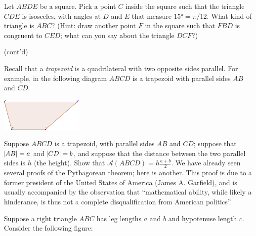\documentclass[answers]{exam}
\begin{document}
\begin{questions}
  \question Let $ ABDE $ be a square. Pick a point $ C $ inside the square such that the triangle $ CDE $ is isosceles,
            with angles at $ D $ and $ E $ that measure $ \ang{15} = \pi/12 $. What kind of triangle is $ ABC $? (Hint:
            draw another point $ F $ in the square such that $ FBD $ is congruent to $ CED $; what can you say about
            the triangle $ DCF $?)
  \vfill
  \begin{flushright} (cont'd)\end{flushright}
  \clearpage
  \question Recall that a \emph{trapezoid} is a quadrilateral with two opposite sides parallel. For example, in the following
            diagram $ ABCD $ is a trapezoid with parallel sides $ AB $ and $ CD $.

            \begin{center}
              \includegraphics[width=0.3\textwidth]{exercises-1-1}
            \end{center}

            Suppose $ ABCD $ is a trapezoid, with parallel sides $ AB $ and $ CD $; suppose that $ \abs{AB} = a $ and $ \abs{CD} = b $,
            and suppose that the distance between the two parallel sides is $ h $ (the height). Show that $ \mathcal{A}(ABCD) = h\frac{a + b}{2} $.
  \question We have already seen several proofs of the Pythagorean theorem; here is another. This proof is due to a former president
            of the United States of America (James A. Garfield), and is usually accompanied by the observation that ``mathematical ability, while likely a
            hinderance, is thus not a complete disqualification from American politics''.

            Suppose a right triangle $ ABC $ has leg lengths $ a $ and $ b $ and hypotenuse length $ c $. Consider the following figure:


\end{questions}
\end{document}
